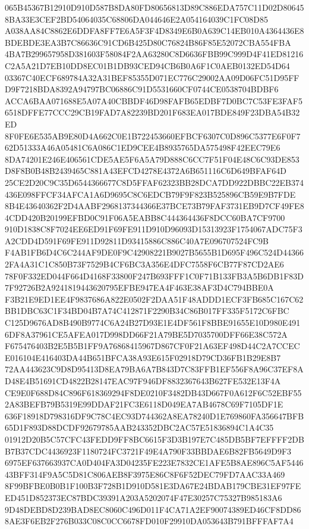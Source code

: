 \documentclass[UTF8,fontset=fandol,zihao=-4,a4paper]{ctexart}
\begin{document}
{{065B45367B12910D910D587B8DA80FD80656813D89C886EDA757C11D02D806458BA33E3CEF2BD54064035C68806DA044646E2A054164039C1FC08D85
A038AA84C8862E6DDFA8FF7E6A5F3F4D8349E6B0A639C14EB010A4364436E8BDEBDE3EA3B7C86636C91CD6B425D80C76824B86F85E52072CBA554FBA
4BA7B299657958D381603F58084F2AA63280C8D6636FBB99C999D4F41ED81216C2A5A21D7EB10DD8EC01B1DB93CED94CB6B0A6F1C0AEB0132ED54D64
03367C40ECF689784A32A31BEF85355D071EC776C29002AA09D06FC51D95FFD9F7218BDA8392A94797BC06886C91D5531660CF0744CE0538704BDBF6
ACCA6BAA071688E5A07A40CBBDF46D98FAFB65EDBF7D0BC7C53FE3FAF56518DFFE77CCC29CB19FAD7A82239BD201F683EA017BDE849F23DBA54B32ED
8F0FE6E535AB9E80D4A662C0E1B722453660EFBCF6307C0D896C5377E6F0F762D51333A46A05481C6A086C1ED9CEE4B8935765DA575498F42EEC79E6
8DA74201E246E406561CDE5AE5F6A5A79D888C6CC7F51F04E48C6C93DE853D8F8B0B48B2439465C881A43EFCD4278E4372A6B651116C6D649BFAF64D
25CE2D20C9C35D6544366677C8D5FFAF62323BB28DCA7DD922DBBC22EB374436E098FFCF34AFCA1A6D9695C8C6EDCB79F9F823B525896CB59E9B7FDE
8B4E43640362F2D4AABF2968137344366E37BCE73B79FAF3731EB9D7CF49FE84CDD420B20199EFBD0C91F06A5EABB8C444364436F8DCC60BA7CF9700
910D1838C8F7024EE6ED91F69FE911D910D96093D15313923F1754067ADC75F3A2CDD4D591F69FE911D92811D93415886C886C40A7E096707524FC9B
F4AB1FB6D4C6C244AF9DE0F9C42908221B9027B5655B1D695F496C524D443662FA4A31C1C850B73F7529B4CF6BC3A356E4DFC7558F6CB77F87CD2AE6
78F0F332ED044F664D4168F33800F247B693FFF1C0F71B133FB3A5B6DB1F83D7F92726B2A9241819443620795EFBE947EA4F463E38AF3D4C794BBE0A
F3B21E9ED1EE4F9837686A822E0502F2DAA51F48ADDD1ECF3FB685C167C62BB1DBC63C1F34BD04B7A74C412871F2290B34C86B017FF335F5172C6FBC
C125D9676AD8B490B9774C6A24B27D93E1E4DF561F8BBE91655E10D980E4916DF8A37961CE5AFEA017D998DD66F21A79BE5D7035700DFF66E38C572A
F675476403B2E5B5B1FF9A76868415967D867CF0F21A63EF498D44C2A7CCECE016104E416403DA44B651BFCA38A93E615F02918D79CD36FB1B29E8B7
72AA443623C9D8D95413D8EA79BA6A7B843D7C83FFB1EF556F8A96C37EF8AD48E4B51691CD4822B28147EAC97F946DF8832367643B627FE532E13F4A
CE9E0F688D84C896F618369294F8DE0210F3482DB43D667F0A612F6C52EBF552A83BEFB79B5319E99DDAF21FC3E6118D049EA7AB4678C69F7105DF1E
636F18918D798316DF9C78C4EC93D744362A8EA78240D1E769860FA356647BFB65D1F893D88DCDF92679785AAB243352DBC2AC57E51836894C1A4C35
01912D20B5C57CFC43FEDD9FF8BC6615F3D3B197E7C485DB5BF7EFFFF2DBB7B37CDC4436923F1180724FC3721F49E4A790F33BBDAE6B82FB5649D9F3
6975EF637663937CA0D404FA3D04235FE223E7832CE1AFE5B8AE896C5AF544643BFF314F9A5C5D81C806AEB8F3975E86C8F6F52DEC79FD7AAC33A469
8F99BFBE0B0B1F100B3F728B1D910D581E3DA67E24BDAB179CBE31EF97FEED451D852373EC87BDC39391A203A5202074F47E30257C75327B985183A6
9D48DEBD8D239BAD8EC8060C496D011F4CA71A2EF90074389ED46CF8DD868AE3F6EB2F276B033C08C0CC6678FD010F29910DA053643B791BFFFAF7A4
}}
\end{document}
